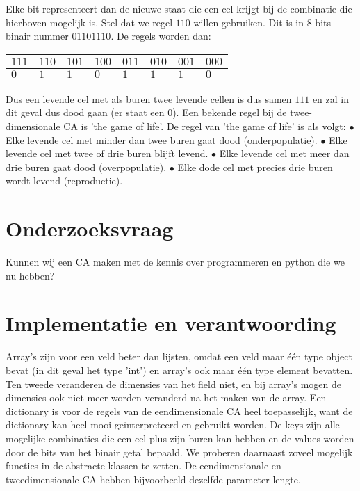 \documentclass[12pt,a4paper]{article}
\begin{document}
Elke bit representeert dan de nieuwe staat die een cel krijgt bij de combinatie die hierboven mogelijk is.
Stel dat we regel $110$ willen gebruiken. Dit is in 8-bits binair nummer $01101110$.
De regels worden dan:
\begin{center}
\begin{tabular}{|m{0.6cm}|m{0.6cm}|m{0.6cm}|m{0.6cm}|m{0.6cm}|m{0.6cm}|m{0.6cm}|m{0.6cm}|}
    \hline
    $111$ & $110$ & $101$ & $100$ & $011$ & $010$ & $001$ & $000$ \\
    \hline
    $0$ & $1$ & $1$ & $0$ & $1$ & $1$ & $1$ & $0$ \\
    \hline
\end{tabular}
\end{center}
\vspace{10pt}
Dus een levende cel met als buren twee levende cellen is dus samen $111$ en zal in dit geval dus dood gaan (er staat een $0$).
Een bekende regel bij de twee-dimensionale CA is 'the game of life'. 
\newline
De regel van 'the game of life' is als volgt:
\vspace{4pt}
\newline
$\bullet$ Elke levende cel met minder dan twee buren gaat dood (onderpopulatie). 
\newline 
$\bullet$ Elke levende cel met twee of drie buren blijft levend.
\newline
$\bullet$ Elke levende cel met meer dan drie buren gaat dood (overpopulatie).
\newline 
$\bullet$ Elke dode cel met precies drie buren wordt levend (reproductie).
\newline
\section*{Onderzoeksvraag}
Kunnen wij een CA maken met de kennis over programmeren en python die we nu hebben?

\section*{Implementatie en verantwoording}
Array's zijn voor een veld beter dan lijsten, omdat een veld maar één type object bevat (in dit geval het type 'int') 
en array's ook maar één type element bevatten.  
Ten tweede veranderen de dimensies van het field niet, en bij array's mogen de dimensies ook niet meer worden veranderd na
het maken van de array. Een dictionary is voor de regels van de eendimensionale CA heel toepasselijk, want 
de dictionary kan heel mooi geïnterpreteerd en gebruikt worden. 
De keys zijn alle mogelijke combinaties die een cel plus zijn buren kan hebben
en de values worden door de bits van het binair getal bepaald. 
We proberen daarnaast zoveel mogelijk functies in de abstracte klassen te zetten.
De eendimensionale en tweedimensionale CA hebben bijvoorbeeld dezelfde parameter lengte.   
\end{document}
